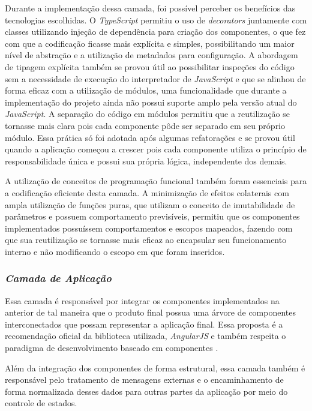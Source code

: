 Durante a implementação dessa camada, foi possível perceber os benefícios das tecnologias escolhidas. O \textit{TypeScript} permitiu o uso de \textit{decorators} juntamente com classes utilizando injeção de dependência para criação dos componentes, o que fez com que a codificação ficasse mais explícita e simples, possibilitando um maior nível de abstração e a utilização de metadados para configuração. A abordagem de tipagem explícita também se provou útil ao possibilitar inspeções do código sem a necessidade de execução do interpretador de \textit{JavaScript} e que se alinhou de forma eficaz com a utilização de módulos, uma funcionalidade que durante a implementação do projeto ainda não possui suporte amplo pela versão atual do \textit{JavaScript}. A separação do código em módulos permitiu que a reutilização se tornasse mais clara pois cada componente pôde ser separado em seu próprio módulo. Essa prática só foi adotada após algumas refatorações e se provou útil quando a aplicação começou a crescer pois cada componente utiliza o princípio de responsabilidade única e possui sua própria lógica, independente dos demais.

A utilização de conceitos de programação funcional também foram essenciais para a codificação eficiente desta camada. A minimização de efeitos colaterais com ampla utilização de funções puras, que utilizam o conceito de imutabilidade de parâmetros e possuem comportamento previsíveis, permitiu que os componentes implementados possuíssem comportamentos e escopos mapeados, fazendo com que sua reutilização se tornasse mais eficaz ao encapsular seu funcionamento interno e não modificando o escopo em que foram inseridos.

\subsubsection{{\it Camada de Aplicação}}

Essa camada é responsável por integrar os componentes implementados na anterior de tal maneira que o produto final possua uma árvore de componentes interconectados que possam representar a aplicação final. Essa proposta é a recomendação oficial da biblioteca utilizada, \textit{AngularJS} e também respeita o paradigma de desenvolvimento baseado em componentes \cite{pressman2011}.

Além da integração dos componentes de forma estrutural, essa camada também é responsável pelo tratamento de mensagens externas e o encaminhamento de forma normalizada desses dados para outras partes da aplicação por meio do controle de estados.

